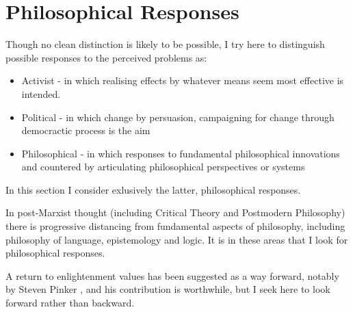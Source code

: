 \documentclass[10pt,titlepage]{book}
\begin{document}
\section{Philosophical Responses}

Though no clean distinction is likely to be possible, I try here to distinguish possible responses to the perceived problems as:

\begin{itemize}
\item Activist -
  in which realising effects by whatever means seem most effective is intended.
\item Political -
  in which change by persuasion, campaigning for change through democractic process is the aim
\item Philosophical -
  in which responses to fundamental philosophical innovations and countered by articulating philosophical perspectives or systems
\end{itemize}

In this section I consider exlusively the latter, philosophical responses.

In post-Marxist thought (including Critical Theory and Postmodern Philosophy) there is progressive distancing from fundamental aspects of philosophy, including philosophy of language, epistemology and logic.
It is in these areas that I look for philosophical responses.

A return to enlightenment values has been suggested as a way forward, notably by Steven Pinker \cite{pinker-en}, and his contribution is worthwhile, but I seek here to look forward rather than backward.


{}








\end{document}
